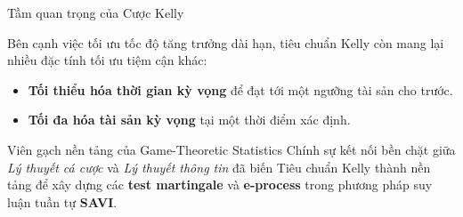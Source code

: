 \begin{frame}{Tầm quan trọng của Cược Kelly}

Bên cạnh việc tối ưu tốc độ tăng trưởng dài hạn, tiêu chuẩn Kelly còn mang lại nhiều đặc tính tối ưu tiệm cận khác:

\begin{itemize}
    \item \textbf{Tối thiểu hóa thời gian kỳ vọng} để đạt tới một ngưỡng tài sản cho trước.
    \item \textbf{Tối đa hóa tài sản kỳ vọng} tại một thời điểm xác định.
\end{itemize}

\vspace{0.3cm}
\begin{block}{Viên gạch nền tảng của Game-Theoretic Statistics}
Chính sự kết nối bền chặt giữa \textit{Lý thuyết cá cược} và \textit{Lý thuyết thông tin} đã biến Tiêu chuẩn Kelly thành nền tảng để xây dựng các \textbf{test martingale} và \textbf{e-process} trong phương pháp suy luận tuần tự \textbf{SAVI}.
\end{block}

\end{frame}
